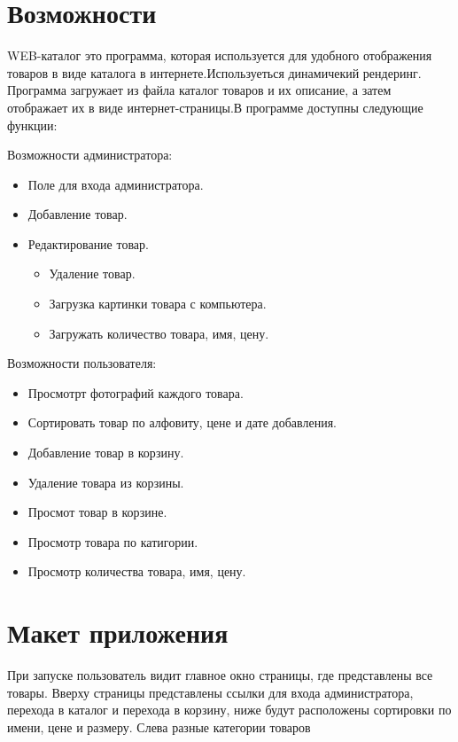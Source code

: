 \documentclass[a4paper,14pt]{extarticle} %
\begin{document}
\section*{Возможности}
WEB-каталог это программа, которая используется для удобного отображения товаров в виде каталога в интернете.Используеться динамичекий рендеринг. Программа загружает из файла каталог товаров и их описание, а затем отображает их в виде интернет-страницы.В программе доступны следующие функции:
\item{Возможности администратора:}
\begin{itemize}

\item{Поле для входа администратора.}
\item{Добавление товар.}

\item{Редактирование товар.}
\begin{itemize}
\item{Удаление товар.}
\item{Загрузка картинки товара с компьютера.}
\item{Загружать количество товара, имя,
цену.}
\end{itemize}
\end{itemize}
\item{Возможности пользователя:}
\begin{itemize}
\item{Просмотрт фотографий каждого товара.}
\item{Сортировать товар по алфовиту, цене и дате добавления.}
\item{Добавление товар в корзину.}
\item{Удаление товара из корзины.}
\item{Просмот товар в корзине.}
\item{Просмотр товара по катигории.}
\item{Просмотр количества товара, имя, цену.}
\end{itemize}


\section*{Макет приложения}

При запуске пользователь видит главное окно страницы, где представлены все товары. Вверху страницы представлены ссылки для входа администратора, перехода в каталог и перехода в корзину, ниже будут расположены сортировки по имени, цене и размеру. Слева разные категории товаров
\end{document}
